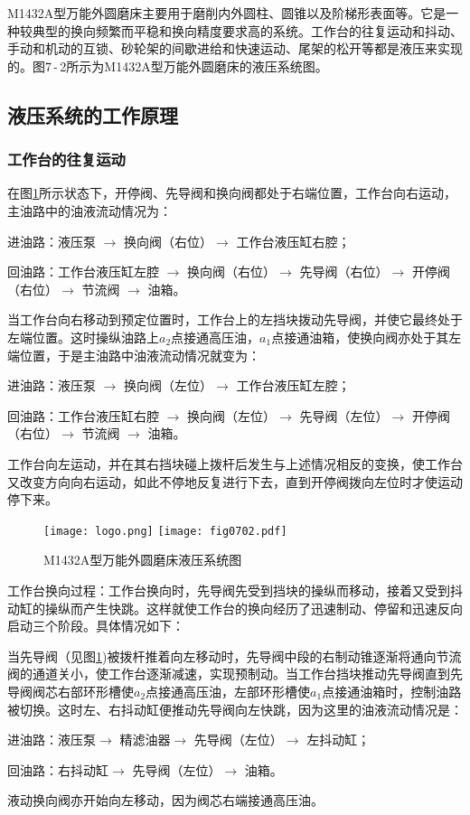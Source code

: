 M1432A型万能外圆磨床主要用于磨削内外圆柱、圆锥以及阶梯形表面等。它是一种较典型的换向频繁而平稳和换向精度要求高的系统。工作台的往复运动和抖动、手动和机动的互锁、砂轮架的间歇进给和快速运动、尾架的松开等都是液压来实现的。图7\,-\,2所示为M1432A型万能外圆磨床的液压系统图。

\subsection {液压系统的工作原理}

\subsubsection {工作台的往复运动}

在图\ref{fig:fig0702}所示状态下，开停阀、先导阀和换向阀都处于右端位置，工作台向右运动，主油路中的油液流动情况为：

进油路：液压泵 $\rightarrow$ 换向阀（右位）$\rightarrow$ 工作台液压缸右腔；

回油路：工作台液压缸左腔 $\rightarrow$ 换向阀（右位）$\rightarrow$ 先导阀（右位）$\rightarrow$ 开停阀（右位）$\rightarrow$ 节流阀 $\rightarrow$ 油箱。

当工作台向右移动到预定位置时，工作台上的左挡块拨动先导阀，并使它最终处于左端位置。这时操纵油路上$a_{2}$点接通高压油，$a_{1}$点接通油箱，使换向阀亦处于其左端位置，于是主油路中油液流动情况就变为：

进油路：液压泵 $\rightarrow$ 换向阀（左位）$\rightarrow$ 工作台液压缸左腔；

回油路：工作台液压缸右腔 $\rightarrow$ 换向阀（左位）$\rightarrow$ 先导阀（左位）$\rightarrow$ 开停阀（右位）$\rightarrow$ 节流阀 $\rightarrow$ 油箱。

工作台向左运动，并在其右挡块碰上拨杆后发生与上述情况相反的变换，使工作台又改变方向向右运动，如此不停地反复进行下去，直到开停阀拨向左位时才使运动停下来。

\begin{figure}[!hbt]
\centering
\ifOpenSource
\texttt{[image: logo.png]}
\else
\texttt{[image: fig0702.pdf]}
\fi
\caption{M1432A型万能外圆磨床液压系统图}
\label{fig:fig0702}
\end{figure}

工作台换向过程：工作台换向时，先导阀先受到挡块的操纵而移动，接着又受到抖动缸的操纵而产生快跳。这样就使工作台的换向经历了迅速制动、停留和迅速反向启动三个阶段。具体情况如下：

当先导阀（见图\ref{fig:fig0702})被拨杆推着向左移动时，先导阀中段的右制动锥逐渐将通向节流阀的通道关小，使工作台逐渐减速，实现预制动。当工作台挡块推动先导阀直到先导阀阀芯右部环形槽使$a_{2}$点接通高压油，左部环形槽使$a_{1}$点接通油箱时，控制油路被切换。这时左、右抖动缸便推动先导阀向左快跳，因为这里的油液流动情况是：

进油路：液压泵$\rightarrow$ 精滤油器$\rightarrow$ 先导阀（左位）$\rightarrow$ 左抖动缸；

回油路：右抖动缸$\rightarrow$ 先导阀（左位）$\rightarrow$ 油箱。

液动换向阀亦开始向左移动，因为阀芯右端接通高压油。